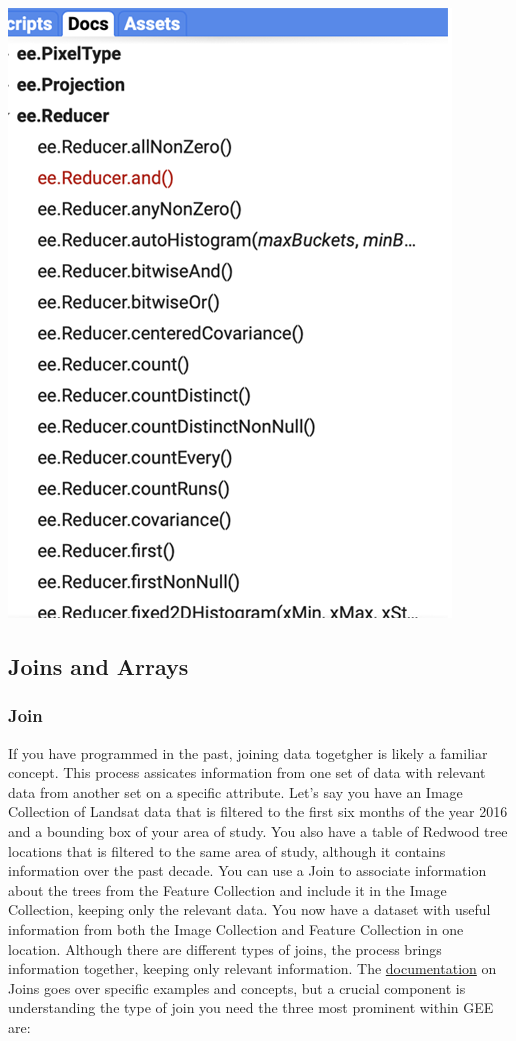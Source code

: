 \documentclass[
]{article}
\begin{document}
\begin{center}\includegraphics[width=0.5\linewidth]{im4} \end{center}

\hypertarget{joins-and-arrays}{%
\subsection{Joins and Arrays}\label{joins-and-arrays}}

\hypertarget{join}{%
\subsubsection{Join}\label{join}}

If you have programmed in the past, joining data togetgher is likely a familiar concept. This process assicates information from one set of data with relevant data from another set on a specific attribute. Let's say you have an Image Collection of Landsat data that is filtered to the first six months of the year 2016 and a bounding box of your area of study. You also have a table of Redwood tree locations that is filtered to the same area of study, although it contains information over the past decade. You can use a Join to associate information about the trees from the Feature Collection and include it in the Image Collection, keeping only the relevant data. You now have a dataset with useful information from both the Image Collection and Feature Collection in one location. Although there are different types of joins, the process brings information together, keeping only relevant information. The \href{https://developers.google.com/earth-engine/guides/joins_save_all}{documentation} on Joins goes over specific examples and concepts, but a crucial component is understanding the type of join you need the three most prominent within GEE are:
\end{document}
